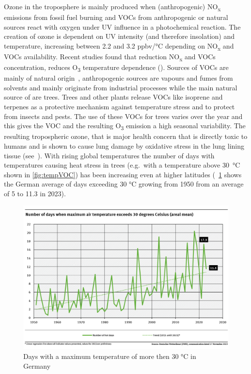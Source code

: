 \documentclass[12pt,a4paper, english,twoside]{scrartcl}
\begin{document}
      Ozone in the troposphere is mainly produced when (anthropogenic) NO\textsubscript{x} emissions from fossil fuel burning and \glspl{VOC} from anthropogenic or natural sources react with oxygen under UV influence in a photochemical reaction.
      The creation of ozone is dependent on UV intensity (and therefore insolation) and temperature, increasing between 2.2 and 3.2 ppbv/°C depending on NO\textsubscript{x} and \glspl{VOC} availability. 
      Recent studies found that reduction NO\textsubscript{x} and \glspl{VOC} concentration, reduces O\textsubscript{3} temperature dependence (\cite{Otero2021}).
      Sources of \glspl{VOC} are mainly of natural origin~\autocite{Kansal2009}, anthropogenic sources are vapours and fumes from solvents and mainly originate from industrial processes while the main natural source of  are trees.
      Trees and other plants release VOCs like isoprene and terpenes as a protective mechanism against temperature stress and to protect from insects and pests. 
      The use of these \glspl{VOC} for trees varies over the year and this gives the \gls{VOC} and the resulting O\textsubscript{3} emission a high seasonal variability. 
      The resulting tropospheric ozone, that is major health concern that is directly toxic to humans and is shown to cause lung damage by oxidative stress in the lung lining tissue (see~\cite{Mudway2000}). 
      With rising global temperatures the number of days with temperatures causing heat stress in trees (e.g.\ with a temperature above 30~°C shown in \cref{fig:tempVOC}) has been increasing even at higher latitudes (~\cref{fig:ubaTemps} shows the German average of days exceeding 30 °C growing from 1950 from an average of 5 to 11.3 in 2023).
      \begin{figure}[htbp]
       \begin{center}
         \includegraphics[width=\textwidth]{img/ubaTemp.png}
       \end{center}
       \caption{Days with a maximum temperature of more then 30 °C in Germany~\autocite[Reprinted from]{Wilke2023}\label{fig:ubaTemps}}
      \end{figure}
\end{document}
